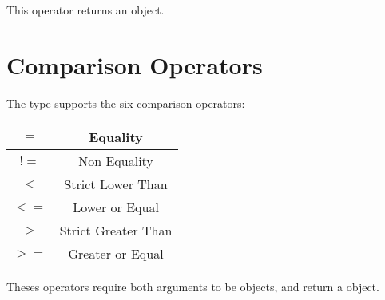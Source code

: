 This operator returns an  object.







\section{Comparison Operators}

The  type supports the six comparison operators:\newline

\begin{tabular}{|c|c|}
\hline
$=$ & Equality \\
\hline
$!=$ & Non Equality \\
\hline
$<$  & Strict Lower Than \\
\hline
$<=$  & Lower or Equal \\
\hline
$>$  & Strict Greater Than \\
\hline
$>=$  & Greater or Equal \\
\hline
\end{tabular}

\vspace{2mm}
Theses operators require both arguments to be  objects, and return a  object.



